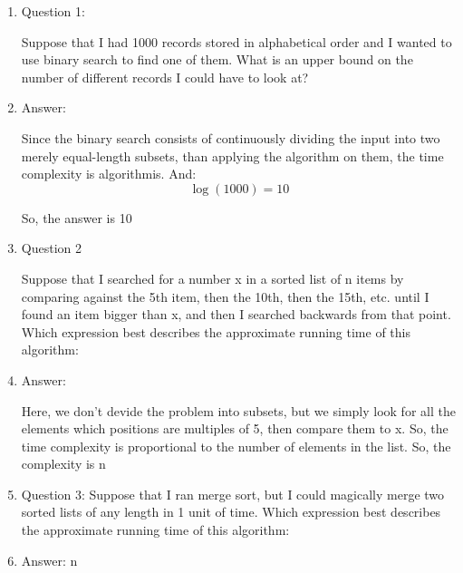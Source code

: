 \documentclass[11pt]{article}
\begin{document}
	
	\author{}
	\title{}
	\maketitle
	
	\medskip
	
	\begin{enumerate}
		
		\item
		Question 1:
		
		Suppose that I had 1000 records stored in alphabetical order and I wanted to use binary search to find one of them. What is an upper bound on the number of different records I could have to look at?
		\item
		Answer:
		
		Since the binary search consists of continuously dividing the input into two merely equal-length subsets, than applying the algorithm on them, the time complexity is algorithmis.
		And:
		\begin{equation}
			\log(1000) = 10
		\end{equation}
		
		So, the answer is 10
		\item
		Question 2
		
		Suppose that I searched for a number x in a sorted list of n items by comparing against the 5th item, then the 10th, then the 15th, etc. until I found an item bigger than x, and then I searched backwards from that point. Which expression best describes the approximate running time of this algorithm:
		
		
		\item
		Answer:
		
		Here, we don't devide the problem into subsets, but we simply look for all the elements which positions are multiples of 5, then compare them to x.
		So, the time complexity is proportional to the number of elements in the list.
		So, the complexity is n
		
		\item
		Question 3:
		Suppose that I ran merge sort, but I could magically merge two sorted lists of any length in 1 unit of time. Which expression best describes the approximate running time of this algorithm:
		
		\item
		Answer:
		n
	\end{enumerate}
	
\end{document}
